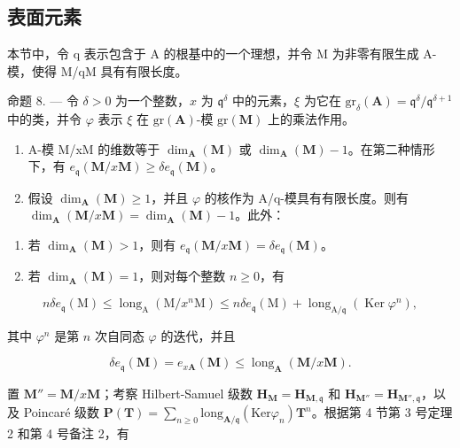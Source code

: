 \subsection{表面元素}

本节中，令 q 表示包含于 A 的根基中的一个理想，并令 M 为非零有限生成 A-模，使得 M/qM 具有有限长度。

命题 8. --- 令 \(\delta > 0\) 为一个整数，\(x\) 为 \(\mathfrak{q}^{\delta}\) 中的元素，\(\xi\) 为它在 \(\mathrm{gr}_{\delta}(\mathbf{A}) = \mathfrak{q}^{\delta}/\mathfrak{q}^{\delta+1}\) 中的类，并令 \(\varphi\) 表示 \(\xi\) 在 \(\mathrm{gr}(\mathbf{A})\)-模 \(\mathrm{gr}(\mathbf{M})\) 上的乘法作用。

\begin{enumerate}
\def\labelenumi{\alph{enumi})}
\item
  A-模 M/xM 的维数等于 \(\dim_{\mathbf{A}}(\mathbf{M})\) 或 \(\dim_{\mathbf{A}}(\mathbf{M}) - 1\)。在第二种情形下，有 \(e_{\mathfrak{q}}(\mathbf{M}/x\mathbf{M}) \geqslant \delta e_{\mathfrak{q}}(\mathbf{M})\)。
\item
  假设 \(\dim_{\mathbf{A}}(\mathbf{M}) \geqslant 1\)，并且 \(\varphi\) 的核作为 A/q-模具有有限长度。则有 \(\dim_{\mathbf{A}}(\mathbf{M}/x\mathbf{M}) = \dim_{\mathbf{A}}(\mathbf{M}) - 1\)。此外：
\end{enumerate}

\begin{enumerate}
\def\labelenumi{(\roman{enumi})}
\item
  若 \(\dim_{\mathbf{A}}(\mathbf{M}) > 1\)，则有 \(e_{\mathfrak{q}}(\mathbf{M} / x\mathbf{M}) = \delta e_{\mathfrak{q}}(\mathbf{M})\)。
\item
  若 \(\dim_{\mathbf{A}}(\mathbf{M}) = 1\)，则对每个整数 \(n \geqslant 0\)，有
\end{enumerate}

\[
n \delta e _ {\mathfrak {q}} (\mathrm{M}) \leqslant \operatorname{long} _ {\mathrm{A}} (\mathrm{M} / x ^ {n} \mathrm{M}) \leqslant n \delta e _ {\mathfrak {q}} (\mathrm{M}) + \operatorname{long} _ {\mathrm{A} / \mathfrak {q}} (\operatorname{Ker} \varphi^ {n}),
\]

其中 \(\varphi^n\) 是第 \(n\) 次自同态 \(\varphi\) 的迭代，并且

\[
\delta e _ {\mathfrak {q}} (\mathbf {M}) = e _ {x \mathbf {A}} (\mathbf {M}) \leqslant \operatorname{long} _ {\mathbf {A}} (\mathbf {M} / x \mathbf {M}).
\]

置 \(\mathbf{M}'' = \mathbf{M} / x\mathbf{M}\)；考察 Hilbert-Samuel 级数 \(\mathbf{H}_{\mathbf{M}} = \mathbf{H}_{\mathbf{M},\mathfrak{q}}\) 和 \(\mathbf{H}_{\mathbf{M}''} = \mathbf{H}_{\mathbf{M}'',\mathfrak{q}}\)，以及 Poincaré 级数 \(\mathbf{P}(\mathbf{T}) = \sum_{n\geqslant 0}\mathrm{long}_{\mathbf{A} / \mathfrak{q}}(\mathrm{Ker}\varphi_n)\mathbf{T}^n\)。根据第 4 节第 3 号定理 2 和第 4 号备注 2，有

